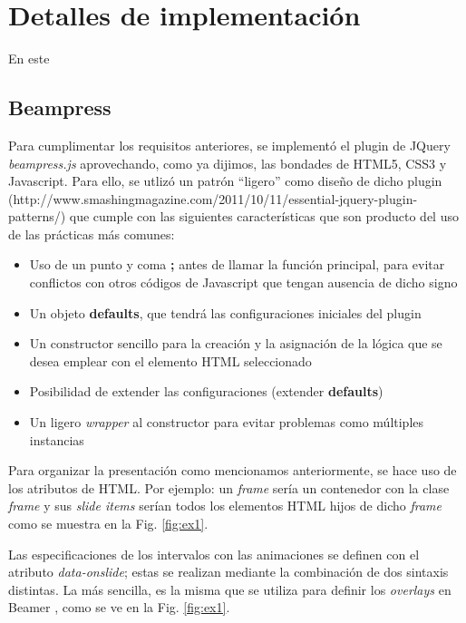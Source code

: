 \chapter{Detalles de implementación} %
\label{cha:detalles_de_implementacion}
	En este

	\section{Beampress} %
	\label{sec:beampress_imp}
	

		Para cumplimentar los requisitos anteriores, se implementó el plugin de JQuery \textit{beampress.js} aprovechando, como ya dijimos, las bondades de HTML5, CSS3 y Javascript. Para ello, se utlizó un patrón ``ligero'' como diseño de dicho plugin (http://www.smashingmagazine.com/2011/10/11/essential-jquery-plugin-patterns/) que cumple con las siguientes características que son producto del uso de las prácticas más comunes:

		\begin{itemize}
			\item Uso de un punto y coma \textbf{;} antes de llamar la función principal, para evitar conflictos con otros códigos de Javascript que tengan ausencia de dicho signo
			\item Un objeto \textbf{defaults}, que tendrá las configuraciones iniciales del plugin
			\item Un constructor sencillo para la creación y la asignación de la lógica que se desea emplear con el elemento HTML seleccionado
			\item Posibilidad de extender las configuraciones (extender \textbf{defaults})
			\item Un ligero \textit{wrapper} al constructor para evitar problemas como múltiples instancias
		\end{itemize}

		Para organizar la presentación como mencionamos anteriormente, se hace uso de los atributos de HTML. 
		Por ejemplo: un \textit{frame} sería un contenedor con la clase \textit{frame} y sus \textit{slide items} serían
		todos los elementos HTML hijos de dicho \textit{frame} como se muestra en la Fig. \ref{fig:ex1}.	 

		Las especificaciones de los intervalos con las animaciones se definen con el atributo \textit{data-onslide}; estas se realizan mediante la combinación de dos sintaxis distintas. La más sencilla, es la misma que se utiliza para definir los \textit{overlays} en Beamer \cite{overlay}, como se ve en la Fig. \ref{fig:ex1}. 
	 

